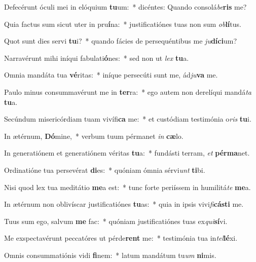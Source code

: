 \item Defecérunt óculi mei in elóquium \textbf{tu}um:~* dicéntes: Quando consolá\textit{be}\textbf{ris} me?
\item Quia factus sum sicut uter in pru\textbf{í}na:~* justificatiónes tuas non sum \textit{ob}\textbf{lí}tus.
\item Quot sunt dies servi \textbf{tu}i?~* quando fácies de persequéntibus me \textit{ju}\textbf{dí}\textbf{ci}um?
\item Narravérunt mihi iníqui fabulati\textbf{ó}nes:~* sed non ut \textit{lex} \textbf{tu}a.
\item Omnia mandáta tua \textbf{vé}ritas:~* iníque persecúti sunt me, ád\textit{ju}\textbf{va} me.
\item Paulo minus consummavérunt me in \textbf{ter}ra:~* ego autem non derelíqui mandá\textit{ta} \textbf{tu}a.
\item Secúndum misericórdiam tuam vivífi\textbf{ca} me:~* et custódiam testimónia o\textit{ris} \textbf{tu}i.
\item In ætérnum, \textbf{Dó}mine,~* verbum tuum pérmanet \textit{in} \textbf{cæ}lo.
\item In generatiónem et generatiónem véritas \textbf{tu}a:~* fundásti terram, \textit{et} \textbf{pér}\textbf{ma}net.
\item Ordinatióne tua persevérat \textbf{di}es:~* quóniam ómnia sérvi\textit{unt} \textbf{ti}bi.
\item Nisi quod lex tua meditátio \textbf{me}a est:~* tunc forte periíssem in humilitá\textit{te} \textbf{me}a.
\item In ætérnum non oblivíscar justificatiónes \textbf{tu}as:~* quia in ipsis vivi\textit{fi}\textbf{cás}\textbf{ti} me.
\item Tuus sum ego, salvum \textbf{me} fac:~* quóniam justificatiónes tuas ex\textit{qui}\textbf{sí}vi.
\item Me exspectavérunt peccatóres ut pérde\textbf{rent} me:~* testimónia tua in\textit{tel}\textbf{lé}xi.
\item Omnis consummatiónis vidi \textbf{fi}nem:~* latum mandátum tu\textit{um} \textbf{ni}mis.
